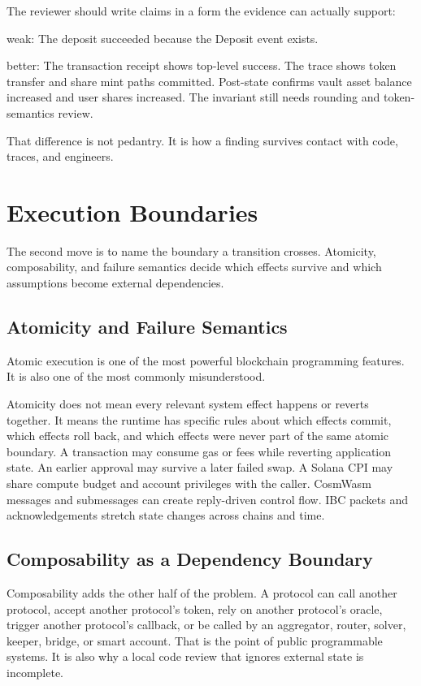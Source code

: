 The reviewer should write claims in a form the evidence can actually support:

\begin{codeblock}
weak:
    The deposit succeeded because the Deposit event exists.

better:
    The transaction receipt shows top-level success.
    The trace shows token transfer and share mint paths committed.
    Post-state confirms vault asset balance increased and user shares increased.
    The invariant still needs rounding and token-semantics review.
\end{codeblock}

That difference is not pedantry. It is how a finding survives contact with code, traces, and engineers.

\section{Execution Boundaries}

The second move is to name the boundary a transition crosses. Atomicity, composability, and failure semantics decide which effects survive and which assumptions become external dependencies.

\subsection{Atomicity and Failure Semantics}

Atomic execution is one of the most powerful blockchain programming features. It is also one of the most commonly misunderstood.

Atomicity does not mean every relevant system effect happens or reverts together. It means the runtime has specific rules about which effects commit, which effects roll back, and which effects were never part of the same atomic boundary. A transaction may consume gas or fees while reverting application state. An earlier approval may survive a later failed swap. A Solana CPI may share compute budget and account privileges with the caller. CosmWasm messages and submessages can create reply-driven control flow. IBC packets and acknowledgements stretch state changes across chains and time.

\subsection{Composability as a Dependency Boundary}

Composability adds the other half of the problem. A protocol can call another protocol, accept another protocol's token, rely on another protocol's oracle, trigger another protocol's callback, or be called by an aggregator, router, solver, keeper, bridge, or smart account. That is the point of public programmable systems. It is also why a local code review that ignores external state is incomplete.

